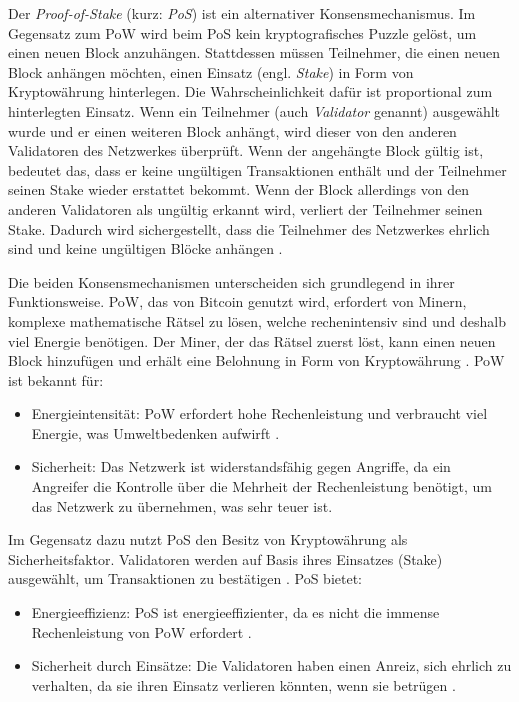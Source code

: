 Der \textit{Proof-of-Stake} (kurz: \textit{PoS}) ist ein alternativer Konsensmechanismus. Im Gegensatz zum PoW wird beim PoS kein kryptografisches Puzzle gelöst, um einen neuen Block anzuhängen. Stattdessen müssen Teilnehmer, die einen neuen Block anhängen möchten, einen Einsatz (engl. \textit{Stake}) in Form von Kryptowährung hinterlegen. Die Wahrscheinlichkeit dafür ist proportional zum hinterlegten Einsatz. Wenn ein Teilnehmer (auch \textit{Validator} genannt) ausgewählt wurde und er einen weiteren Block anhängt, wird dieser von den anderen Validatoren des Netzwerkes überprüft. Wenn der angehängte Block gültig ist, bedeutet das, dass er keine ungültigen Transaktionen enthält und der Teilnehmer seinen Stake wieder erstattet bekommt. Wenn der Block allerdings von den anderen Validatoren als ungültig erkannt wird, verliert der Teilnehmer seinen Stake. Dadurch wird sichergestellt, dass die Teilnehmer des Netzwerkes ehrlich sind und keine ungültigen Blöcke anhängen \parencites[S. 96-97]{Kapengut_EthereumTransitionToProofOfStake}[S. 34]{Meinel_BlockchainHypeInnovation}[S. 320-321]{Antonopoulos_MasteringEthereum}.

Die beiden Konsensmechanismen unterscheiden sich grundlegend in ihrer Funktionsweise. PoW, das von Bitcoin genutzt wird, erfordert von Minern, komplexe mathematische Rätsel zu lösen, welche rechenintensiv sind und deshalb viel Energie benötigen. Der Miner, der das Rätsel zuerst löst, kann einen neuen Block hinzufügen und erhält eine Belohnung in Form von Kryptowährung \parencite{Fill_BlockchainGrundlagen}. PoW ist bekannt für:

\begin{itemize}
    \item Energieintensität: PoW erfordert hohe Rechenleistung und verbraucht viel Energie, was Umweltbedenken aufwirft \parencite[S. 96-97]{Kapengut_EthereumTransitionToProofOfStake}.
    \item Sicherheit: Das Netzwerk ist widerstandsfähig gegen Angriffe, da ein Angreifer die Kontrolle über die Mehrheit der Rechenleistung benötigt, um das Netzwerk zu übernehmen, was sehr teuer ist.
\end{itemize}

\noindent Im Gegensatz dazu nutzt PoS den Besitz von Kryptowährung als Sicherheitsfaktor. Validatoren werden auf Basis ihres Einsatzes (Stake) ausgewählt, um Transaktionen zu bestätigen \parencites[S. 34]{Meinel_BlockchainHypeInnovation}[S. 320-321]{Antonopoulos_MasteringEthereum}. PoS bietet:

\begin{itemize}
    \item Energieeffizienz: PoS ist energieeffizienter, da es nicht die immense Rechenleistung von PoW erfordert \parencite[S. 96-97]{Kapengut_EthereumTransitionToProofOfStake}.
    \item Sicherheit durch Einsätze: Die Validatoren haben einen Anreiz, sich ehrlich zu verhalten, da sie ihren Einsatz verlieren könnten, wenn sie betrügen \parencites[S. 34]{Meinel_BlockchainHypeInnovation}[S. 320-321]{Antonopoulos_MasteringEthereum}.
\end{itemize}

